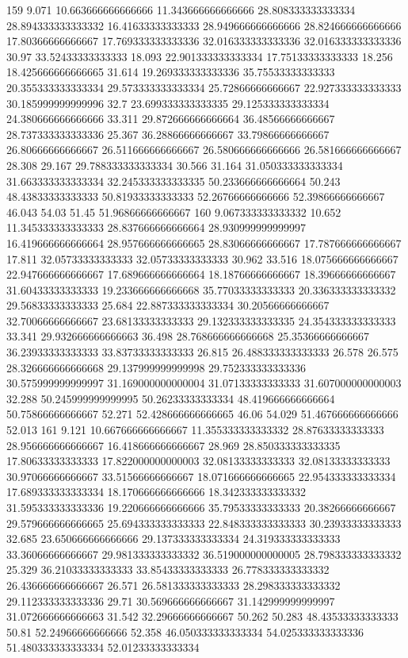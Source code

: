 159 9.071 10.663666666666666 11.343666666666666 28.808333333333334 28.894333333333332 16.41633333333333 28.949666666666666 28.824666666666666 17.80366666666667 17.769333333333336 32.016333333333336 32.016333333333336 30.97 33.52433333333333 18.093 22.901333333333334 17.75133333333333 18.256 18.425666666666665 31.614 19.269333333333336 35.75533333333333 20.355333333333334 29.573333333333334 25.72866666666667 22.927333333333333 30.185999999999996 32.7 23.699333333333335 29.125333333333334 24.380666666666666 33.311 29.872666666666664 36.48566666666667 28.737333333333336 25.367 36.28866666666667 33.79866666666667 26.80666666666667 26.511666666666667 26.580666666666666 26.581666666666667 28.308 29.167 29.788333333333334 30.566 31.164 31.050333333333334 31.663333333333334 32.245333333333335 50.233666666666664 50.243 48.43833333333333 50.81933333333333 52.26766666666666 52.39866666666667 46.043 54.03 51.45 51.96866666666667
160 9.067333333333332 10.652 11.345333333333333 28.837666666666664 28.930999999999997 16.419666666666664 28.957666666666665 28.83066666666667 17.787666666666667 17.811 32.05733333333333 32.05733333333333 30.962 33.516 18.075666666666667 22.947666666666667 17.689666666666664 18.18766666666667 18.39666666666667 31.60433333333333 19.233666666666668 35.77033333333333 20.336333333333332 29.56833333333333 25.684 22.887333333333334 30.20566666666667 32.70066666666667 23.68133333333333 29.132333333333335 24.354333333333333 33.341 29.932666666666663 36.498 28.768666666666668 25.35366666666667 36.23933333333333 33.83733333333333 26.815 26.488333333333333 26.578 26.575 28.326666666666668 29.137999999999998 29.752333333333336 30.575999999999997 31.169000000000004 31.07133333333333 31.607000000000003 32.288 50.245999999999995 50.26233333333334 48.419666666666664 50.75866666666667 52.271 52.428666666666665 46.06 54.029 51.467666666666666 52.013
161 9.121 10.667666666666667 11.355333333333332 28.87633333333333 28.956666666666667 16.418666666666667 28.969 28.850333333333335 17.80633333333333 17.822000000000003 32.08133333333333 32.08133333333333 30.97066666666667 33.51566666666667 18.071666666666665 22.954333333333334 17.689333333333334 18.170666666666666 18.342333333333332 31.595333333333336 19.220666666666666 35.79533333333333 20.38266666666667 29.579666666666665 25.694333333333333 22.848333333333333 30.23933333333333 32.685 23.650666666666666 29.137333333333334 24.319333333333333 33.36066666666667 29.981333333333332 36.519000000000005 28.798333333333332 25.329 36.21033333333333 33.85433333333333 26.778333333333332 26.436666666666667 26.571 26.581333333333333 28.298333333333332 29.112333333333336 29.71 30.569666666666667 31.142999999999997 31.072666666666663 31.542 32.29666666666667 50.262 50.283 48.43533333333333 50.81 52.24966666666666 52.358 46.050333333333334 54.025333333333336 51.480333333333334 52.01233333333334
